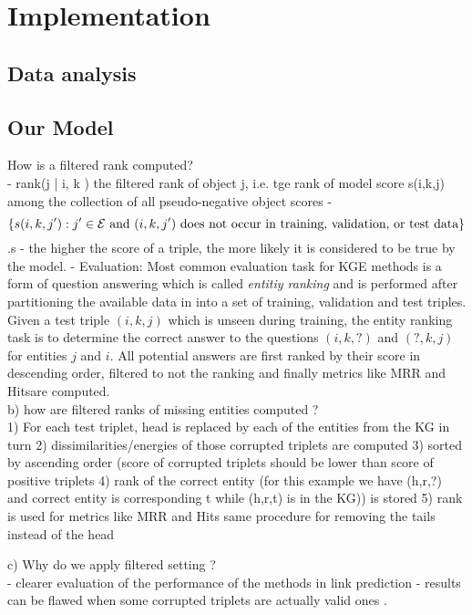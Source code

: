 \chapter{Implementation}
\label{ch:implementation}

\section{Data analysis}





\section{Our Model}








How is a filtered rank computed?\\
\cite{Ruffinelli2020You}
- rank(j | i, k ) the filtered rank of object j, i.e. tge rank of model score s(i,k,j) among the collection of all pseudo-negative object scores
- $$\{s(i,k,j'): j' \in \mathcal{E} \text{ and $(i,k,j')$ does not occur in training, validation, or test data}\}$$.s
- the higher the score of a triple, the more likely it is considered to be true by the model. 
- Evaluation: Most common evaluation task for \ac{KGE} methods is a form of question answering which is called \textit{entitiy ranking} and is performed after  partitioning the available data in into a set of training, validation and test triples. 
Given a test triple $(i,k,j)$  which is unseen during training, the entity ranking task is to determine the correct answer to the questions $(i,k,?)$ and $(?,k,j)$ for entities $j$ and $i$.
All potential answers are first ranked by their score in descending order, filtered to not the ranking and finally metrics like MRR and Hits\@K are computed.\\








b) how are filtered ranks of missing entities computed ?\\
1) For each test triplet, head is replaced by each of the entities from the KG in turn
2) dissimilarities/energies of those corrupted triplets are computed 
3) sorted by ascending order 
(score of corrupted triplets should be lower than score of positive triplets
4) rank of the correct entity (for this example we have (h,r,?) and correct entity is corresponding t while (h,r,t) is in the KG)) is stored
5) rank is used for metrics like MRR and Hits\@K
same procedure for removing the tails instead of the head


c) Why do we apply filtered setting ?\\
- clearer evaluation of the performance of the methods in link prediction
- results can be flawed when some corrupted triplets are actually valid
ones \cite{TransE}.







